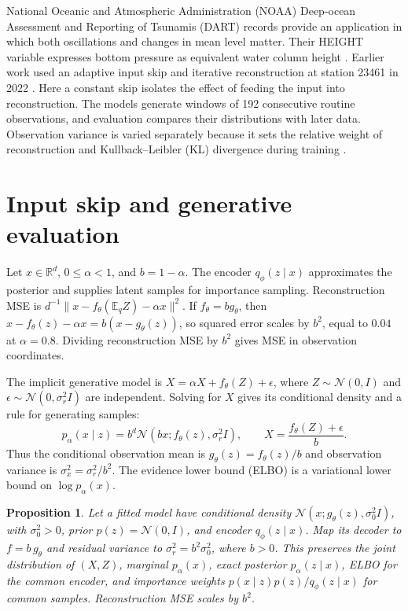 \documentclass{article}
\newcommand{\E}{\mathbb{E}}
\newtheorem{proposition}{Proposition}
\begin{document}
National Oceanic and Atmospheric Administration (NOAA) Deep-ocean Assessment and Reporting of Tsunamis (DART) records provide an application in which both oscillations and changes in mean level matter. Their HEIGHT variable expresses bottom pressure as equivalent water column height \citep{NDBCDARTDescription,Meinig2005DARTII}. Earlier work used an adaptive input skip and iterative reconstruction at station 23461 in 2022 \citep{Lee2024DARTPredecessor}. Here a constant skip isolates the effect of feeding the input into reconstruction. The models generate windows of 192 consecutive routine observations, and evaluation compares their distributions with later data. Observation variance is varied separately because it sets the relative weight of reconstruction and Kullback--Leibler (KL) divergence during training \citep{Rybkin2021CalibratedDecoders}.

\section{Input skip and generative evaluation}
Let $x\in\mathbb{R}^d$, $0\leq\alpha<1$, and $b=1-\alpha$. The encoder $q_\phi(z\mid x)$ approximates the posterior and supplies latent samples for importance sampling. Reconstruction MSE is $d^{-1}\|x-f_\theta(\E_q Z)-\alpha x\|^2$. If $f_\theta=b g_\theta$, then $x-f_\theta(z)-\alpha x=b(x-g_\theta(z))$, so squared error scales by $b^2$, equal to $0.04$ at $\alpha=0.8$. Dividing reconstruction MSE by $b^2$ gives MSE in observation coordinates.

The implicit generative model is $X=\alpha X+f_\theta(Z)+\epsilon$, where $Z\sim\mathcal{N}(0,I)$ and $\epsilon\sim\mathcal{N}(0,\sigma_r^2I)$ are independent. Solving for $X$ gives its conditional density and a rule for generating samples:
\begin{equation}
 p_\alpha(x\mid z)=b^d\mathcal{N}(bx;f_\theta(z),\sigma_r^2I),
 \qquad X=\frac{f_\theta(Z)+\epsilon}{b}.
\label{eq:density}
\end{equation}
Thus the conditional observation mean is $g_\theta(z)=f_\theta(z)/b$ and observation variance is $\sigma_x^2=\sigma_r^2/b^2$. The evidence lower bound (ELBO) is a variational lower bound on $\log p_\alpha(x)$.

\begin{proposition}
\label{prop:equivalence}
Let a fitted model have conditional density $\mathcal{N}(x;g_\theta(z),\sigma_0^2I)$, with $\sigma_0^2>0$, prior $p(z)=\mathcal{N}(0,I)$, and encoder $q_\phi(z\mid x)$. Map its decoder to $f=b\,g_\theta$ and residual variance to $\sigma_r^2=b^2\sigma_0^2$, where $b>0$. This preserves the joint distribution of $(X,Z)$, marginal $p_\alpha(x)$, exact posterior $p_\alpha(z\mid x)$, ELBO for the common encoder, and importance weights $p(x\mid z)p(z)/q_\phi(z\mid x)$ for common samples. Reconstruction MSE scales by $b^2$.
\end{proposition}
\end{document}
